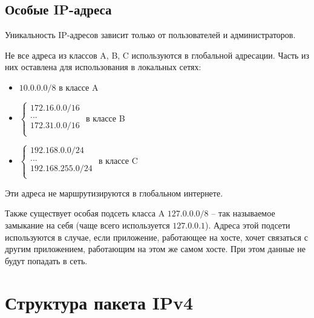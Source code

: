 \subsection{Особые IP-адреса}
Уникальность IP-адресов зависит только от пользователей и администраторов. 

Не все адреса из классов A, B, C используются в глобальной адресации. Часть из них оставлена для использования в локальных сетях:
\begin{itemize}
	\item $10.0.0.0/8$ в классе A
	\item $\left\{
			\begin{array}{ll}
				172.16.0.0/16\\
				...\\
				172.31.0.0/16\\
			\end{array}\right.$ в классе B
	\item $\left\{
			\begin{array}{ll}
				192.168.0.0/24\\
				...\\
				192.168.255.0/24\\
			\end{array}\right.$ в классе C
\end{itemize}
Эти адреса не маршрутизируются в глобальном интернете.

Также существует особая подсеть класса A $127.0.0.0/8$ -- так называемое замыкание на себя (чаще всего используется $127.0.0.1$). Адреса этой подсети используются в случае, если приложение, работающее на хосте, хочет связаться с другим приложением, работающим на этом же самом хосте. При этом данные не будут попадать в сеть.

\section{Структура пакета IPv4}
